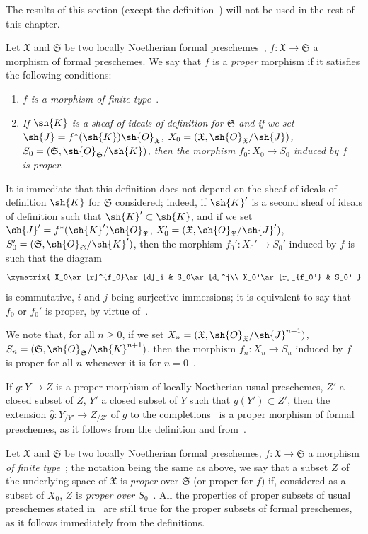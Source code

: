 The results of this section (except the definition~) will not be used in the rest of this chapter.

\begin{env}[3.4.1]
\label{III.3.4.1}
Let $\mathfrak{X}$ and $\mathfrak{S}$ be two locally Noetherian formal preschemes~, $f:\mathfrak{X}\to\mathfrak{S}$ a morphism of formal preschemes.
We say that $f$ is a \emph{proper} morphism if it satisfies the following conditions:
\begin{enumerate}
  \item[1st.] \emph{$f$ is a morphism of finite type~}.
  \item[2nd.] \emph{If $\sh{K}$ is a sheaf of ideals of definition for $\mathfrak{S}$ and if we set $\sh{J}=f^*(\sh{K})\sh{O}_\mathfrak{X}$, $X_0=(\mathfrak{X},\sh{O}_\mathfrak{X}/\sh{J})$, $S_0=(\mathfrak{S},\sh{O}_\mathfrak{S}/\sh{K})$, then the morphism $f_0:X_0\to S_0$ induced by $f$~ is proper}.
\end{enumerate}
It is immediate that this definition does not depend on the sheaf of ideals of definition $\sh{K}$ for $\mathfrak{S}$ considered; indeed, if $\sh{K}'$ is a second sheaf of ideals of definition such that $\sh{K}'\subset\sh{K}$, and if we set $\sh{J}'=f^*(\sh{K}')\sh{O}_\mathfrak{X}$, $X_0'=(\mathfrak{X},\sh{O}_\mathfrak{X}/\sh{J}')$, $S_0'=(\mathfrak{S},\sh{O}_\mathfrak{S}/\sh{K}')$, then the morphism $f_0':X_0'\to S_0'$ induced by $f$ is such that the diagram
\[
  \xymatrix{
    X_0\ar[r]^{f_0}\ar[d]_i &
    S_0\ar[d]^j\\
    X_0'\ar[r]_{f_0'} &
    S_0'
  }
\]
is commutative, $i$ and $j$ being surjective immersions; it is equivalent to say that $f_0$ or $f_0'$ is proper, by virtue of~.

We note that, for all $n\geq 0$, if we set $X_n=(\mathfrak{X},\sh{O}_\mathfrak{X}/\sh{J}^{n+1})$, $S_n=(\mathfrak{S},\sh{O}_\mathfrak{S}/\sh{K}^{n+1})$, then the morphism $f_n:X_n\to S_n$ induced by $f$~ is proper for all $n$ whenever it is for $n=0$~.

If $g:Y\to Z$ is a proper morphism of locally Noetherian usual preschemes, $Z'$ a closed subset of $Z$, $Y'$ a closed subset of $Y$ such that $g(Y')\subset Z'$, then the extension $\widehat{g}:Y_{/Y'}\to Z_{/Z'}$ of $g$ to the completions~ is a proper morphism of formal preschemes, as it follows from the definition and from~.

Let $\mathfrak{X}$ and $\mathfrak{S}$ be two locally Noetherian formal preschemes, $f:\mathfrak{X}\to\mathfrak{S}$ a morphism \emph{of finite type}~; the notation being the same as above, we say that a subset $Z$ of the underlying space of $\mathfrak{X}$ is \emph{proper} over $\mathfrak{S}$ (or proper for $f$) if, considered as a subset of $X_0$, $Z$ is \emph{proper over $S_0$}~.
All the properties of proper subsets of usual preschemes stated in~ are still true for the proper subsets of formal preschemes, as it follows immediately from the definitions.
\end{env}

